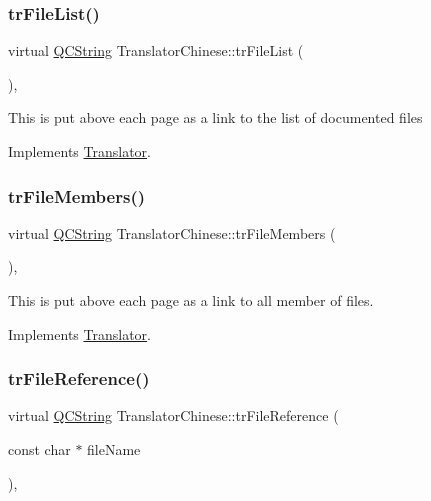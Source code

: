 \mbox{\label{class_translator_chinese_a229e10b54649dca1749009588af44456}} 
\subsubsection{\texorpdfstring{trFileList()}{trFileList()}}
{\footnotesize\ttfamily virtual \mbox{\hyperlink{class_q_c_string}{Q\+C\+String}} Translator\+Chinese\+::tr\+File\+List (\begin{DoxyParamCaption}{ }\end{DoxyParamCaption})\hspace{0.3cm}{\ttfamily [inline]}, {\ttfamily [virtual]}}

This is put above each page as a link to the list of documented files 

Implements \mbox{\hyperlink{class_translator}{Translator}}.

\mbox{\label{class_translator_chinese_af147a641f6b582b15e54027a4637d453}} 
\subsubsection{\texorpdfstring{trFileMembers()}{trFileMembers()}}
{\footnotesize\ttfamily virtual \mbox{\hyperlink{class_q_c_string}{Q\+C\+String}} Translator\+Chinese\+::tr\+File\+Members (\begin{DoxyParamCaption}{ }\end{DoxyParamCaption})\hspace{0.3cm}{\ttfamily [inline]}, {\ttfamily [virtual]}}

This is put above each page as a link to all member of files. 

Implements \mbox{\hyperlink{class_translator}{Translator}}.

\mbox{\label{class_translator_chinese_ae401169f6585e9ffafd3ad5b55de58e2}} 
\subsubsection{\texorpdfstring{trFileReference()}{trFileReference()}}
{\footnotesize\ttfamily virtual \mbox{\hyperlink{class_q_c_string}{Q\+C\+String}} Translator\+Chinese\+::tr\+File\+Reference (\begin{DoxyParamCaption}\item[{const char $\ast$}]{file\+Name }\end{DoxyParamCaption})\hspace{0.3cm}{\ttfamily [inline]}, {\ttfamily [virtual]}}

